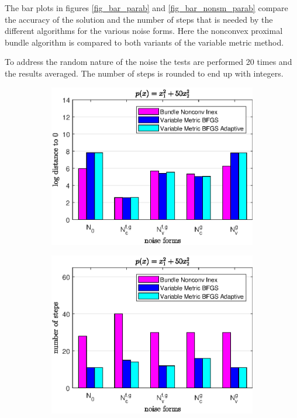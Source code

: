 The bar plots in figures \ref{fig_bar_parab} and \ref{fig_bar_nonsm_parab} compare the accuracy of the solution and the number of steps that is needed by the different algorithms for the various noise forms. Here the nonconvex proximal bundle algorithm is compared to both variants of the variable metric method.

To address the random nature of the noise the tests are performed 20 times and the results averaged. The number of steps is rounded to end up with integers.

\begin{figure}[ht]
	\begin{subfigure}[t]{0.49\textwidth}
		\includegraphics[width=\textwidth]{Pictures/Plots/accuracy_bar_parab_u_1-2.eps}
	\end{subfigure}
	\begin{subfigure}[t]{0.49\textwidth}
			\includegraphics[width=\textwidth]{Pictures/Plots/steps_bar_parab_u_1-2.eps}

\end{subfigure}
\end{figure}
